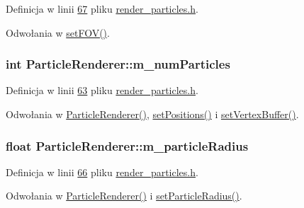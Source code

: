 Definicja w linii \hyperlink{render__particles_8h_source_l00067}{67} pliku \hyperlink{render__particles_8h_source}{render\-\_\-particles.\-h}.



Odwołania w \hyperlink{render__particles_8h_source_l00046}{set\-F\-O\-V()}.

\hypertarget{class_particle_renderer_af885fdb5e6da925209dfd960f66b5fd8}{
\subsubsection[{m\-\_\-num\-Particles}]{\setlength{\rightskip}{0pt plus 5cm}int Particle\-Renderer\-::m\-\_\-num\-Particles\hspace{0.3cm}{\ttfamily [protected]}}}\label{class_particle_renderer_af885fdb5e6da925209dfd960f66b5fd8}


Definicja w linii \hyperlink{render__particles_8h_source_l00063}{63} pliku \hyperlink{render__particles_8h_source}{render\-\_\-particles.\-h}.



Odwołania w \hyperlink{render__particles_8cpp_source_l00025}{Particle\-Renderer()}, \hyperlink{render__particles_8cpp_source_l00042}{set\-Positions()} i \hyperlink{render__particles_8cpp_source_l00048}{set\-Vertex\-Buffer()}.

\hypertarget{class_particle_renderer_aab5ee3cd769a64c45dc9714aabdb0ee2}{
\subsubsection[{m\-\_\-particle\-Radius}]{\setlength{\rightskip}{0pt plus 5cm}float Particle\-Renderer\-::m\-\_\-particle\-Radius\hspace{0.3cm}{\ttfamily [protected]}}}\label{class_particle_renderer_aab5ee3cd769a64c45dc9714aabdb0ee2}


Definicja w linii \hyperlink{render__particles_8h_source_l00066}{66} pliku \hyperlink{render__particles_8h_source}{render\-\_\-particles.\-h}.



Odwołania w \hyperlink{render__particles_8cpp_source_l00025}{Particle\-Renderer()} i \hyperlink{render__particles_8h_source_l00042}{set\-Particle\-Radius()}.

